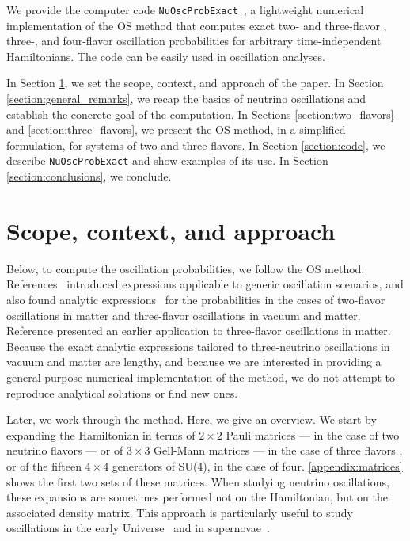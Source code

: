 \documentclass[final,5p,times,twocolumn]{elsarticle}
\providecommand{\DIFaddtex}[1]{{\protect\color{blue} \sf #1}} %
\providecommand{\DIFdeltex}[1]{{\protect\color{red} \scriptsize #1}} %
\providecommand{\DIFaddbegin}{} %
\providecommand{\DIFaddend}{} %
\providecommand{\DIFdelbegin}{} %
\providecommand{\DIFdelend}{} %
\providecommand{\DIFadd}[1]{\DIFaddtex{#1}} %
\providecommand{\DIFdel}[1]{\DIFdeltex{#1}} %
\begin{document}
We provide the computer code {\tt NuOscProbExact}\ \cite{NuOscProbExact}, a lightweight numerical implementation of the OS method that computes exact two-\DIFdelbegin \DIFdel{and three-flavor }\DIFdelend \DIFaddbegin \DIFadd{, three-, and four-flavor }\DIFaddend oscillation probabilities for arbitrary time-independent Hamiltonians.  The code can be easily used in oscillation analyses.

In Section \ref{section:scope}, we set the scope, context, and approach of the paper.  In Section \ref{section:general_remarks}, we recap the basics of neutrino oscillations and establish the concrete goal of the computation.  In Sections \ref{section:two_flavors} and \ref{section:three_flavors}, we present the OS method, in a simplified formulation, for systems of two and three flavors.  In Section \ref{section:code}, we describe {\tt NuOscProbExact} and show examples of its use.  In Section \ref{section:conclusions}, we conclude.




\section{Scope, context, and approach}
\label{section:scope}

Below, to compute the oscillation probabilities, we follow the OS method.  References\ \cite{Ohlsson:1999xb, Ohlsson:1999um, Ohlsson:2000zz, Ohlsson:2001et} introduced expressions applicable to generic oscillation scenarios, and also found analytic expressions\ \cite{Ohlsson:1999xb} for the probabilities in the cases of two-flavor oscillations in matter and three-flavor oscillations in vacuum and matter.  Reference \cite{Barger:1980tf} presented an earlier application to three-flavor oscillations in matter.  Because the exact analytic expressions tailored to three-neutrino oscillations in vacuum and matter are lengthy, and because we are interested in providing a general-purpose numerical implementation of the method, we do not attempt to reproduce analytical solutions or find new ones.  

Later, we work through the method.  Here, we give an overview.  We start by expanding the Hamiltonian in terms of $2 \times 2$ Pauli matrices --- in the case of two neutrino flavors --- or of $3 \times 3$ Gell-Mann matrices --- in the case of three flavors\DIFaddbegin \DIFadd{, or of the fifteen $4 \times 4$ generators of SU(4), in the case of four}\DIFaddend .  \ref{appendix:matrices} shows \DIFaddbegin \DIFadd{the first two sets of }\DIFaddend these matrices.  When studying neutrino oscillations, these expansions are sometimes performed not on the Hamiltonian, but on the associated density matrix.  This approach is particularly useful to study oscillations in the early Universe\ \cite{McKellar:1992ja, Bell:1998ds, Hannestad:2001iy, Wong:2002fa, Hannestad:2012ky, Boriero:2017tkh} and in supernovae\ \cite{Pantaleone:1994ns, Sigl:1994hc, Pastor:2002we, Balantekin:2004ug, Fogli:2007bk, Dasgupta:2007ws, Duan:2010bg, Mirizzi:2015eza}.  
\end{document}
